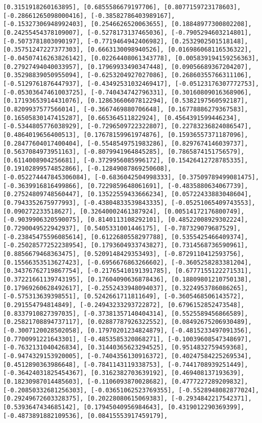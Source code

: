\documentclass[11pt]{article}
\begin{document}
\begin{Verbatim}[commandchars=\\\{\}]
[0.3151918260163895], [0.6855586679197706], [0.8077159723178603], [-0.28661265098000416], [-0.38582786403989167], [-0.15327306948992403], [0.2546626520063655], [0.18848977300802208], [0.24255454378109007], [-0.5278173137465036], [-0.7905294603214801], [-0.5073781803090197], [-0.7719464942406982], [0.2532902501518148], [0.35751247227377303], [0.6663130098940526], [0.016986068116536322], [-0.04507416263826142], [0.02264408061343778], [0.005839194159256363], [0.27927494040033957], [0.17969933490347448], [0.09056689367204207], [0.35298839050955094], [-0.6253204927027086], [0.26860355766311106], [-0.5129761876447937], [-0.43492531032469417], [-0.05123176307772753], [-0.05303647461003725], [-0.740434742796331], [0.30160809016368906], [0.17193653914431076], [0.12863660607812294], [0.5382197560592187], [0.8209937577566014], [-0.3667469880706648], [0.16778886279367583], [0.16505830147415287], [0.665364511822924], [0.4564391599446234], [-0.5344805776038929], [-0.7296509722322807], [0.22783236824086547], [0.4864019656400513], [0.17678159961974876], [0.15936557371187096], [0.28477604017400404], [-0.5548549751983286], [0.8297674146039737], [0.5637084973951163], [-0.8079941964845285], [0.7865874151756579], [0.6114008904256681], [-0.3729956085996172], [0.15426412728785335], [0.19102899574852866], [-0.12849087869250608], [-0.052274447845306084], [-0.6836042504998333], [0.37509789499081475], [-0.3639916816499866], [0.7229859648061691], [-0.4835880634067739], [0.27524809748560447], [0.13522559433666234], [0.05722433883048604], [0.7943352675977993], [-0.43804833539843335], [-0.05251065409743553], [0.090272233518627], [0.32640002461387924], [0.00514172176800749], [-0.9039906320590075], [0.8140113108292101], [0.48522008929302224], [0.7290049522942937], [0.5405331001446175], [-0.787329079687529], [-0.23845475596085614], [0.6122680558297788], [0.5355425466409374], [-0.25028577252238954], [0.1793604933743827], [0.7314568736590961], [0.8856679468363475], [0.5209148429353493], [-0.8729110412593756], [0.15566353513627423], [-0.6956676863266602], [-0.3605258283381204], [0.34376762719867754], [-0.21765410191391785], [0.6777155122271531], [0.37221661139743195], [0.17604090636878436], [0.18809801210750138], [0.17969260628492617], [-0.2552433948094037], [0.3224953786086265], [-0.575313639398551], [0.5242661711811649], [-0.3605468506143572], [0.291554794814849], [-0.24943233293722872], [0.6796152852473548], [0.8337910827397035], [-0.37381357140404314], [0.5525589456866589], [0.25821708894737117], [0.02887787926322552], [0.08492675206930489], [-0.3007120028502058], [0.17970201234824879], [-0.4815233497091356], [0.7700991221643301], [-0.4853585320868271], [-0.10039608547348697], [-0.7632131040426834], [0.31440365623294525], [0.9514832759459368], [-0.9474329153920005], [-0.7404356130916372], [0.40247584225269534], [0.4512890363986648], [-0.7841143119338753], [-0.7441708939251449], [-0.36424031825454367], [0.3162382703639192], [0.469408137193639], [0.18230987014485603], [-0.1106093870028682], [0.4777227289209832], [-0.20850332681256303], [-0.03651062523769355], [-0.5528948082877024], [0.29249672603328375], [0.20228080615069383], [-0.2934842217542371], [0.5393647434685142], [0.17945040956984643], [0.4319012290369399], [-0.4873891882109536], [0.08415553917459179], 
\end{Verbatim}
\end{document}
